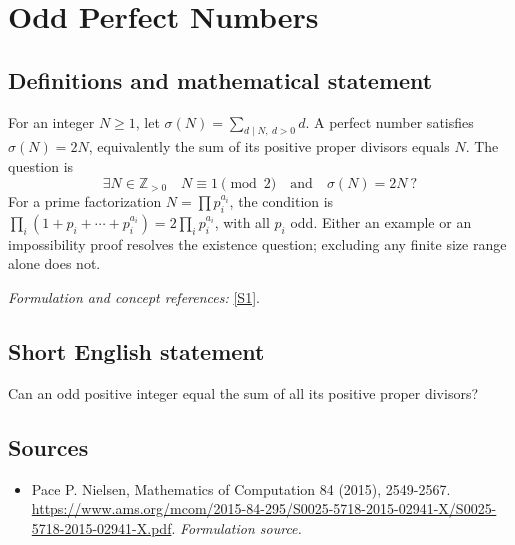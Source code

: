 \documentclass[11pt]{article}
\begin{document}
\section*{\texorpdfstring{Odd Perfect Numbers}{Odd Perfect Numbers}}\label{statement}
\subsection{Definitions and mathematical statement}
For an integer $N\ge1$, let $\sigma(N)=\sum_{d\mid N,\ d>0}d$. A perfect number satisfies $\sigma(N)=2N$, equivalently the sum of its positive proper divisors equals $N$. The question is
\[
 \exists N\in{\mathbb{Z}}_{>0}\quad N\equiv1\pmod2\quad\text{and}\quad\sigma(N)=2N\ ?
\]
For a prime factorization $N=\prod p_i^{a_i}$, the condition is
$\prod_i(1+p_i+\cdots+p_i^{a_i})=2\prod_i p_i^{a_i}$, with all $p_i$ odd. Either an example or an impossibility proof resolves the existence question; excluding any finite size range alone does not.
\par\smallskip\textit{Formulation and concept references:} \href{https://www.ams.org/mcom/2015-84-295/S0025-5718-2015-02941-X/S0025-5718-2015-02941-X.pdf}{[S1]}.

\subsection{Short English statement}
Can an odd positive integer equal the sum of all its positive proper divisors?
\subsection{Sources}
\begin{itemize}
\item[S1]Pace P. Nielsen, Mathematics of Computation 84 (2015), 2549-2567.
\url{https://www.ams.org/mcom/2015-84-295/S0025-5718-2015-02941-X/S0025-5718-2015-02941-X.pdf}.
\textit{Formulation source.}
\end{itemize}
\end{document}

